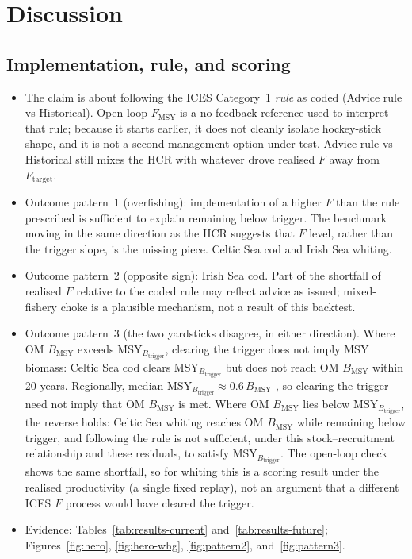 \documentclass[11pt,a4paper]{article}
\newcommand{\Fmsy}{F_{\mathrm{MSY}}}
\newcommand{\Btrig}{\mathrm{MSY}_{B_{\mathrm{trigger}}}}
\newcommand{\Bmsy}{B_{\mathrm{MSY}}}
\newcommand{\Ftar}{F_{\mathrm{target}}}
\begin{document}
\section{Discussion}
\label{sec:discussion}

\subsection{Implementation, rule, and scoring}
\begin{itemize}
  \item The claim is about following the ICES Category~1 \emph{rule} as
        coded (Advice rule vs Historical). Open-loop $\Fmsy$ is a
        no-feedback reference used to interpret that rule; because it
        starts earlier, it does not cleanly isolate hockey-stick shape,
        and it is not a second management option under test. Advice
        rule vs Historical still mixes the HCR with whatever drove
        realised $F$ away from $\Ftar$.
  \item Outcome pattern~1 (overfishing): implementation of a higher $F$
        than the rule prescribed is sufficient to explain remaining below
        trigger. The benchmark moving in the same direction as the HCR
        suggests that $F$ level, rather than the trigger slope, is the
        missing piece. Celtic Sea cod and Irish Sea whiting.
  \item Outcome pattern~2 (opposite sign): Irish Sea cod. Part of the
        shortfall of realised $F$ relative to the coded rule may reflect
        advice as issued; mixed-fishery choke is a plausible mechanism,
        not a result of this backtest.
  \item Outcome pattern~3 (the two yardsticks disagree, in either
        direction). Where OM $\Bmsy$ exceeds $\Btrig$, clearing the
        trigger does not imply MSY biomass: Celtic Sea cod clears
        $\Btrig$ but does not reach OM $\Bmsy$ within 20 years.
        Regionally, median $\Btrig\approx 0.6\,\Bmsy$
        \citep{winker2026rebuilding}, so clearing the trigger need not
        imply that OM $\Bmsy$ is met. Where OM $\Bmsy$ lies below
        $\Btrig$, the reverse holds: Celtic Sea whiting reaches OM
        $\Bmsy$ while remaining below trigger, and following the rule is
        not sufficient, under this stock--recruitment relationship and
        these residuals, to satisfy $\Btrig$. The open-loop check shows
        the same shortfall, so for whiting this is a scoring result under
        the realised productivity (a single fixed replay), not an
        argument that a different ICES $F$ process would have cleared the
        trigger.
  \item Evidence: Tables~\ref{tab:results-current}
        and~\ref{tab:results-future}; Figures~\ref{fig:hero},
        \ref{fig:hero-whg}, \ref{fig:pattern2}, and~\ref{fig:pattern3}.
\end{itemize}
\end{document}

